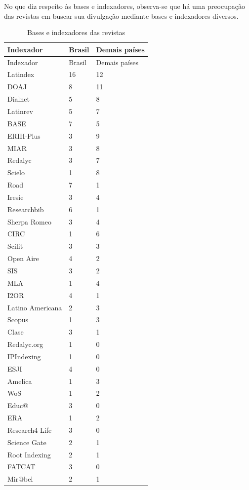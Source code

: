 \documentclass[
  a4paper,
]{book}
\begin{document}
No que diz respeito às bases e indexadores, observa-se que há uma
preocupação das revistas em buscar sua divulgação mediante bases e
indexadores diversos.

\begin{longtable}[]{@{}lll@{}}
\caption{Bases e indexadores das revistas}\label{tbl-7}\tabularnewline
\toprule\noalign{}
Indexador & Brasil & Demais países \\
\midrule\noalign{}
\endfirsthead
\toprule\noalign{}
Indexador & Brasil & Demais países \\
\midrule\noalign{}
\endhead
\bottomrule\noalign{}
\endlastfoot
Latindex & 16 & 12 \\
DOAJ & 8 & 11 \\
Dialnet & 5 & 8 \\
Latinrev & 5 & 7 \\
BASE & 7 & 5 \\
ERIH-Plus & 3 & 9 \\
MIAR & 3 & 8 \\
Redalyc & 3 & 7 \\
Scielo & 1 & 8 \\
Road & 7 & 1 \\
Iresie & 3 & 4 \\
Researchbib & 6 & 1 \\
Sherpa Romeo & 3 & 4 \\
CIRC & 1 & 6 \\
Scilit & 3 & 3 \\
Open Aire & 4 & 2 \\
SIS & 3 & 2 \\
MLA & 1 & 4 \\
I2OR & 4 & 1 \\
Latino Americana & 2 & 3 \\
Scopus & 1 & 3 \\
Clase & 3 & 1 \\
Redalyc.org & 1 & 0 \\
IPIndexing & 1 & 0 \\
ESJI & 4 & 0 \\
Amelica & 1 & 3 \\
WoS & 1 & 2 \\
Educ@ & 3 & 0 \\
ERA & 1 & 2 \\
Research4 Life & 3 & 0 \\
Science Gate & 2 & 1 \\
Root Indexing & 2 & 1 \\
FATCAT & 3 & 0 \\
Mir@bel & 2 & 1 \\

\end{longtable}
\end{document}
